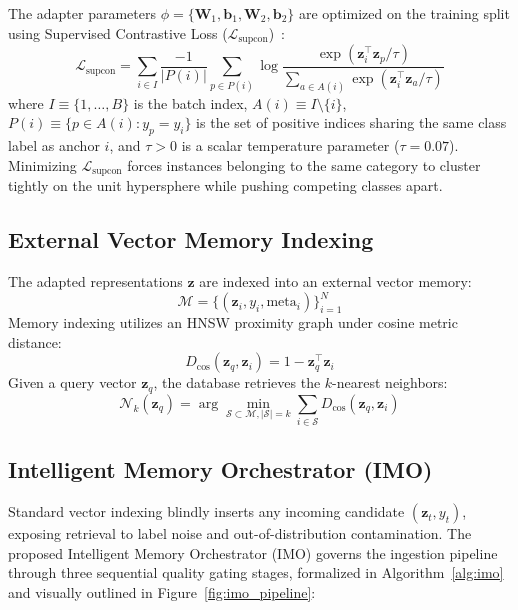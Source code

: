 \documentclass[sn-mathphys,Numbered]{sn-jnl}
\begin{document}
The adapter parameters $\phi = \{\mathbf{W}_1, \mathbf{b}_1, \mathbf{W}_2, \mathbf{b}_2\}$ are optimized on the training split using Supervised Contrastive Loss ($\mathcal{L}_{\text{supcon}}$)~\cite{khosla2020supervised}:
\begin{equation}
\mathcal{L}_{\text{supcon}} = \sum_{i \in I} \frac{-1}{|P(i)|} \sum_{p \in P(i)} \log \frac{\exp\left(\mathbf{z}_i^\top \mathbf{z}_p / \tau\right)}{\sum_{a \in A(i)} \exp\left(\mathbf{z}_i^\top \mathbf{z}_a / \tau\right)}
\label{eq:supcon_loss}
\end{equation}
where $I \equiv \{1, \dots, B\}$ is the batch index, $A(i) \equiv I \setminus \{i\}$, $P(i) \equiv \{p \in A(i) : y_p = y_i\}$ is the set of positive indices sharing the same class label as anchor $i$, and $\tau > 0$ is a scalar temperature parameter ($\tau = 0.07$). Minimizing $\mathcal{L}_{\text{supcon}}$ forces instances belonging to the same category to cluster tightly on the unit hypersphere while pushing competing classes apart.

\subsection{External Vector Memory Indexing}
The adapted representations $\mathbf{z}$ are indexed into an external vector memory:
\begin{equation}
\mathcal{M} = \{(\mathbf{z}_i, y_i, \text{meta}_i)\}_{i=1}^N
\label{eq:memory_def}
\end{equation}
Memory indexing utilizes an HNSW proximity graph under cosine metric distance:
\begin{equation}
D_{\text{cos}}(\mathbf{z}_q, \mathbf{z}_i) = 1 - \mathbf{z}_q^\top \mathbf{z}_i
\label{eq:cosine_dist}
\end{equation}
Given a query vector $\mathbf{z}_q$, the database retrieves the $k$-nearest neighbors:
\begin{equation}
\mathcal{N}_k(\mathbf{z}_q) = \arg\min_{\mathcal{S} \subset \mathcal{M}, |\mathcal{S}|=k} \sum_{i \in \mathcal{S}} D_{\text{cos}}(\mathbf{z}_q, \mathbf{z}_i)
\label{eq:knn_query}
\end{equation}

\subsection{Intelligent Memory Orchestrator (IMO)}
Standard vector indexing blindly inserts any incoming candidate $(\mathbf{z}_t, y_t)$, exposing retrieval to label noise and out-of-distribution contamination. The proposed Intelligent Memory Orchestrator (IMO) governs the ingestion pipeline through three sequential quality gating stages, formalized in Algorithm~\ref{alg:imo} and visually outlined in Figure~\ref{fig:imo_pipeline}:
\end{document}
